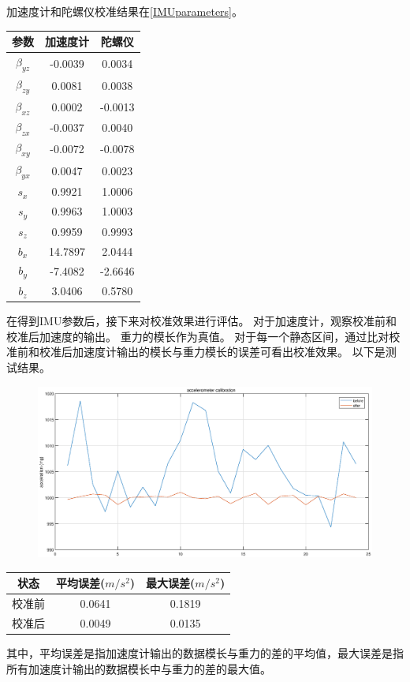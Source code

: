 \documentclass[
  type=master
]{gdutthesis}
\begin{document}
加速度计和陀螺仪校准结果在\autoref{IMUparameters}。
\begin{table}[h]
	\label{IMUparameters}
	\begin{tabular}{ccc}
		\toprule
		参数 & 加速度计 & 陀螺仪 \\
		\midrule
		$\beta_{yz}$ & -0.0039 & 0.0034\\
		$\beta_{zy}$ & 0.0081 & 0.0038\\
		$\beta_{xz}$ & 0.0002 & -0.0013\\
		$\beta_{zx}$ & -0.0037 & 0.0040\\
		$\beta_{xy}$ & -0.0072 & -0.0078\\
		$\beta_{yx}$ & 0.0047 & 0.0023\\
		$s_x$ & 0.9921 & 1.0006\\
		$s_y$ & 0.9963 & 1.0003\\
		$s_z$ & 0.9959 & 0.9993\\
		$b_x$ & 14.7897 & 2.0444\\
		$b_y$ & -7.4082 & -2.6646\\
		$b_z$ & 3.0406 & 0.5780\\
		\bottomrule
	\end{tabular}
\end{table}
在得到IMU参数后，接下来对校准效果进行评估。
对于加速度计，观察校准前和校准后加速度的输出。
重力的模长作为真值。
对于每一个静态区间，通过比对校准前和校准后加速度计输出的模长与重力模长的误差可看出校准效果。
以下是测试结果。
\begin{figure}[H]
	\centering
	\includegraphics[width=1.0\textwidth]{acccalib.eps}
	\label{fig:acccalib}
\end{figure}

\begin{table}[h]
	\label{acccaliberr}
	\begin{tabular}{ccc}
		\toprule
		状态 & 平均误差($m/s^2$) & 最大误差($m/s^2$) \\
		\midrule
		校准前 & 0.0641 & 0.1819 \\
		校准后 & 0.0049 & 0.0135 \\
		\bottomrule
	\end{tabular}
\end{table}
其中，平均误差是指加速度计输出的数据模长与重力的差的平均值，最大误差是指所有加速度计输出的数据模长中与重力的差的最大值。
\end{document}
